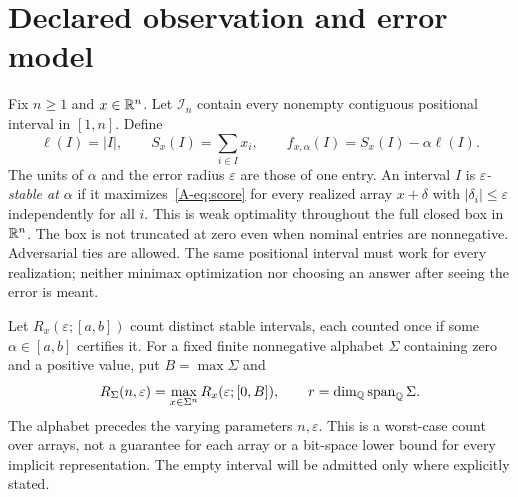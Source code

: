 \section{Declared observation and error model}
Fix $n\ge1$ and $x\in\mathbb R^n$. Let $\mathcal I_n$ contain every nonempty contiguous positional interval in $[1,n]$. Define
\begin{equation}\label{A-eq:score}
\ell(I)=|I|,\qquad S_x(I)=\sum_{i\in I}x_i,\qquad
f_{x,\alpha}(I)=S_x(I)-\alpha\ell(I).
\end{equation}
The units of $\alpha$ and the error radius $\varepsilon$ are those of one entry. An interval $I$ is \emph{$\varepsilon$-stable at $\alpha$} if it maximizes~\eqref{A-eq:score} for every realized array $x+\delta$ with $|\delta_i|\le\varepsilon$ independently for all $i$. This is weak optimality throughout the full closed box in $\mathbb R^n$. The box is not truncated at zero even when nominal entries are nonnegative. Adversarial ties are allowed. The same positional interval must work for every realization; neither minimax optimization nor choosing an answer after seeing the error is meant.

Let $R_x(\varepsilon;[a,b])$ count distinct stable intervals, each counted once if some $\alpha\in[a,b]$ certifies it. For a fixed finite nonnegative alphabet $\Sigma$ containing zero and a positive value, put $B=\max\Sigma$ and
\begin{equation}\label{A-eq:count}
R_\Sigma(n,\varepsilon)=\max_{x\in\Sigma^n}R_x(\varepsilon;[0,B]),
\qquad r=\dim_\mathbb Q\operatorname{span}_\mathbb Q\Sigma.
\end{equation}
The alphabet precedes the varying parameters $n,\varepsilon$. This is a worst-case count over arrays, not a guarantee for each array or a bit-space lower bound for every implicit representation. The empty interval will be admitted only where explicitly stated.

